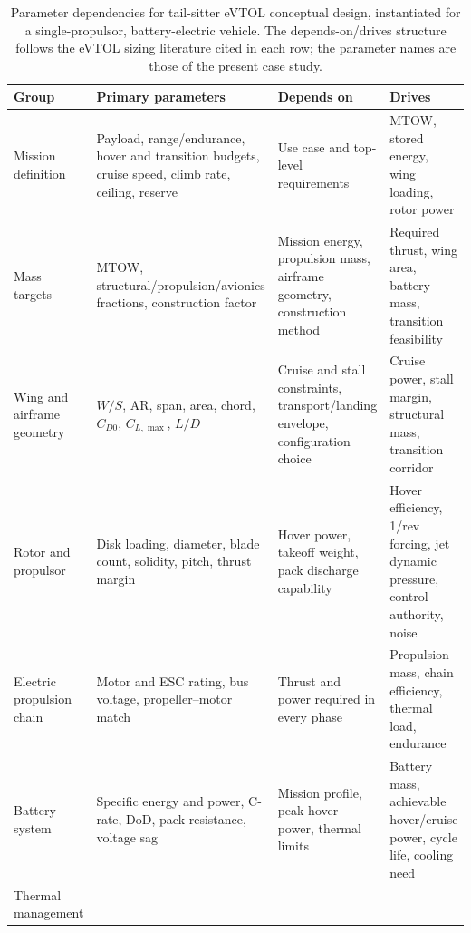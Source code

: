 \begin{table}[htbp]
\centering
\caption{Parameter dependencies for tail-sitter eVTOL conceptual design,
instantiated for a single-propulsor, battery-electric vehicle. The
depends-on/drives structure follows the eVTOL sizing literature cited in
each row; the parameter names are those of the present case study.}
\label{tab:deps}
\footnotesize
\begin{tabularx}{\textwidth}{@{}lXXX@{}}
\toprule
\textbf{Group} & \textbf{Primary parameters} & \textbf{Depends on} &
\textbf{Drives} \\
\midrule
Mission definition &
Payload, range/endurance, hover and transition budgets, cruise speed,
climb rate, ceiling, reserve &
Use case and top-level requirements \citep{he2025,lee2020} &
MTOW, stored energy, wing loading, rotor power
\citep{tyan2017,hu2022} \\
\addlinespace
Mass targets &
MTOW, structural/propulsion/avionics fractions, construction factor &
Mission energy, propulsion mass, airframe geometry, construction method
\citep{ugwueze2022,he2025} &
Required thrust, wing area, battery mass, transition feasibility
\citep{tyan2017,zhong2021} \\
\addlinespace
Wing and airframe geometry &
$W/S$, AR, span, area, chord, $C_{D0}$, $C_{L,\max}$, $L/D$ &
Cruise and stall constraints, transport/landing envelope, configuration
choice \citep{donateo2022,lee2020} &
Cruise power, stall margin, structural mass, transition corridor
\citep{hu2022,kubo2008} \\
\addlinespace
Rotor and propulsor &
Disk loading, diameter, blade count, solidity, pitch, thrust margin &
Hover power, takeoff weight, pack discharge capability
\citep{an2022,albamaestre2021,liu2024,qing2019} &
Hover efficiency, 1/rev forcing, jet dynamic pressure, control
authority, noise \citep{liu2024,govindarajan2018,sheng2015} \\
\addlinespace
Electric propulsion chain &
Motor and ESC rating, bus voltage, propeller--motor match &
Thrust and power required in every phase \citep{chahba2023} &
Propulsion mass, chain efficiency, thermal load, endurance
\citep{chahba2023} \\
\addlinespace
Battery system &
Specific energy and power, C-rate, DoD, pack resistance, voltage sag &
Mission profile, peak hover power, thermal limits
\citep{park2024,he2025} &
Battery mass, achievable hover/cruise power, cycle life, cooling need
\citep{park2024,zhao2024thermal} \\
\addlinespace
Thermal management &

\end{tabularx}
\end{table}
